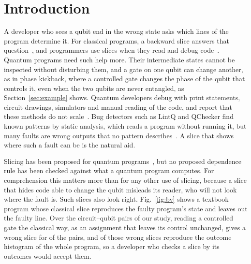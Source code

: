 \section{Introduction}\label{sec:intro}

A developer who sees a qubit end in the wrong state asks which lines of the program determine it. For classical
programs, a backward slice answers that question~\cite{weiser1984program}, and programmers use slices when they
read and debug code~\cite{weiser1982programmers, binkley2007source}. Quantum programs need such help more. Their
intermediate states cannot be inspected without disturbing them, and a gate on one qubit can change another, as in
phase kickback, where a controlled gate changes the phase of the qubit that controls it, even when the two qubits
are never entangled, as Section~\ref{sec:example} shows. Quantum developers debug with print
statements, circuit drawings, simulators and manual reading of the code, and report that these methods do not
scale~\cite{zappin2026challenges}. Bug detectors such as LintQ and QChecker find known patterns by static analysis,
which reads a program without running it, %
but many faults are wrong outputs that no pattern describes~\cite{paltenghi2024lintq, zhao2023qchecker}. A slice
that shows where such a fault can be is the natural aid.

Slicing has been proposed for quantum programs~\cite{yu2025qpdg, kaul2023uniform, murillo2025roadmap}, but no
proposed dependence rule has been checked against what a quantum program computes. For comprehension this matters
more than for any other use of slicing, because a slice that hides code able to change the qubit misleads its
reader, who will not look where the fault is. Such slices also look right. Fig.~\ref{fig:bv} shows a textbook
program whose classical slice reproduces the faulty program's state and leaves out the faulty line. Over the
\numNPairs{} circuit--qubit pairs of our study, reading a controlled gate the classical way, as an assignment that
leaves its control unchanged, gives a wrong slice for \numCpdgUnsoundPct{} of the pairs, and \numFdCpdgZMatchPct{} of
those wrong slices reproduce the outcome histogram of the whole program, so a developer who checks a slice by its
outcomes would accept them.

